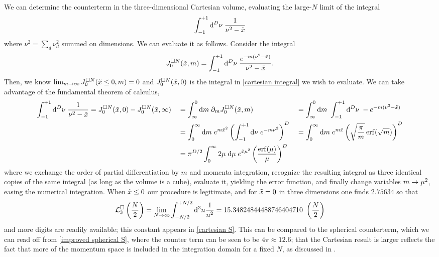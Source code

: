 We can determine the counterterm in the three-dimensional Cartesian volume, evaluating the large-$N$ limit of the integral
\begin{equation}\label{eq:cartesian integral}
    \int_{-1}^{+1} \mathrm{d}^D\nu\; \frac{1}{\nu^2 - \tilde{x}}
\end{equation}
where $\nu^2 = \sum_d \nu_d^2$ summed on dimensions.
We can evaluate it as follows.  Consider the integral
\begin{equation}
	J^{\square N}_0(\tilde{x}, m) = \int_{-1}^{+1} \mathrm{d}^D\nu\; \frac{e^{-m (\nu^2-\tilde{x})}}{\nu^2-\tilde{x}}.
\end{equation}
Then, we know $\lim_{m\rightarrow\infty} J^{\square N}_0(\tilde{x}\leq0, m) = 0$ and $J^{\square N}_0(\tilde{x}, 0)$ is the integral in \eqref{cartesian integral} we wish to evaluate.
We can take advantage of the fundamental theorem of calculus,
\begin{align}
	\int_{-1}^{+1} \mathrm{d}^D\nu\; \frac{1}{\nu^2-\tilde{x}}
    &=
    J^{\square N}_0(\tilde{x},0) - J^{\square N}_0(\tilde{x},\infty)
		&&= 	\int_{\infty}^{0} \mathrm{d}m\; \partial_m J^{\square N}_0(\tilde{x},m)
		&&=	\int_{\infty}^{0} \mathrm{d}m\ \int_{-1}^{+1} \mathrm{d}^D\nu\; -e^{-m (\nu^2-\tilde{x})}
		\nonumber\\
		&&&=	\int_0^\infty \mathrm{d}m\; e^{m \tilde{x}^2}\left(\int_{-1}^{+1} \mathrm{d}\nu\; e^{-m \nu^2}\right)^D
		&&=	\int_0^\infty \mathrm{d}m\; e^{m\tilde{x}}\left(\sqrt{\frac{\pi}{m}} \operatorname{erf}(\sqrt{m})\right)^D
        \nonumber\\
    &&&=
    \pi^{D/2} \int_{0}^{\infty} 2\mu\; \mathrm{d}\mu\; e^{\tilde{x} \mu^2} \left(\frac{\operatorname{erf}(\mu)}{\mu}\right)^D
\end{align}
where we exchange the order of partial differentiation by $m$ and momenta integration, recognize the resulting integral as three identical copies of the same integral (as long as the volume is a cube), evaluate it, yielding the error function, and finally change variables $m\rightarrow\mu^2$, easing the numerical integration.
When $\tilde{x}\leq0$ our procedure is legitimate, and for $\tilde{x}=0$ in three dimensions one finds $2.75634$ so that
\begin{equation}
    \label{eq:cartesian counterterm}
    \mathcal{L}^\square_3 \left(\frac{N}{2}\right) = \lim_{N\rightarrow\infty}\int_{-N/2}^{+N/2} \mathrm{d}^3n \frac{1}{n^2} = 15.34824844488746404710\ \left(\frac{N}{2}\right)
\end{equation}
and more digits are readily available; this constant appears in \eqref{cartesian S}.
This can be compared to the spherical counterterm, which we can read off from \eqref{improved spherical S}, where the counter term can be seen to be $4\pi \approx 12.6 $; that the Cartesian result is larger reflects the fact that more of the momentum space is included in the integration domain for a fixed $N$, as discussed in .

